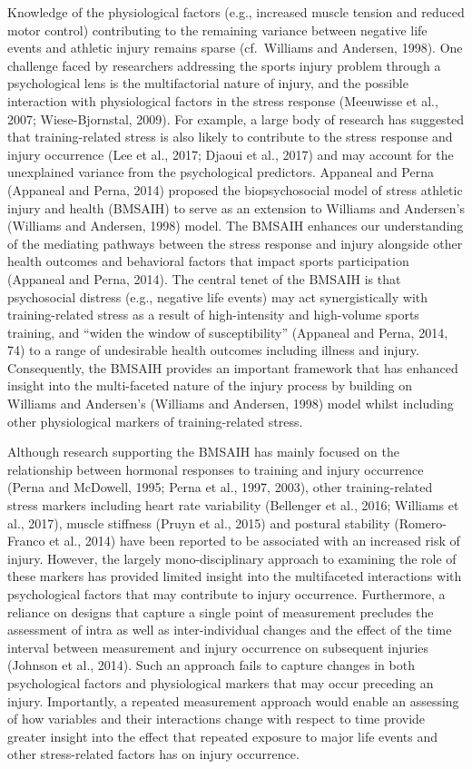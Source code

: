 \documentclass[
  english,
  man,floatsintext]{apa6}
\begin{document}
Knowledge of the physiological factors (e.g., increased muscle tension and reduced motor control) contributing to the remaining variance between negative life events and athletic injury remains sparse (cf.~Williams and Andersen, 1998). One challenge faced by researchers addressing the sports injury problem through a psychological lens is the multifactorial nature of injury, and the possible interaction with physiological factors in the stress response (Meeuwisse et al., 2007; Wiese-Bjornstal, 2009). For example, a large body of research has suggested that training-related stress is also likely to contribute to the stress response and injury occurrence (Lee et al., 2017; Djaoui et al., 2017) and may account for the unexplained variance from the psychological predictors. Appaneal and Perna (Appaneal and Perna, 2014) proposed the biopsychosocial model of stress athletic injury and health (BMSAIH) to serve as an extension to Williams and Andersen's (Williams and Andersen, 1998) model. The BMSAIH enhances our understanding of the mediating pathways between the stress response and injury alongside other health outcomes and behavioral factors that impact sports participation (Appaneal and Perna, 2014). The central tenet of the BMSAIH is that psychosocial distress (e.g., negative life events) may act synergistically with training-related stress as a result of high-intensity and high-volume sports training, and ``widen the window of susceptibility'' (Appaneal and Perna, 2014, 74) to a range of undesirable health outcomes including illness and injury. Consequently, the BMSAIH provides an important framework that has enhanced insight into the multi-faceted nature of the injury process by building on Williams and Andersen's (Williams and Andersen, 1998) model whilst including other physiological markers of training-related stress.

Although research supporting the BMSAIH has mainly focused on the relationship between hormonal responses to training and injury occurrence (Perna and McDowell, 1995; Perna et al., 1997, 2003), other training-related stress markers including heart rate variability (Bellenger et al., 2016; Williams et al., 2017), muscle stiffness (Pruyn et al., 2015) and postural stability (Romero-Franco et al., 2014) have been reported to be associated with an increased risk of injury. However, the largely mono-disciplinary approach to examining the role of these markers has provided limited insight into the multifaceted interactions with psychological factors that may contribute to injury occurrence. Furthermore, a reliance on designs that capture a single point of measurement precludes the assessment of intra as well as inter-individual changes and the effect of the time interval between measurement and injury occurrence on subsequent injuries (Johnson et al., 2014). Such an approach fails to capture changes in both psychological factors and physiological markers that may occur preceding an injury. Importantly, a repeated measurement approach would enable an assessing of how variables and their interactions change with respect to time provide greater insight into the effect that repeated exposure to major life events and other stress-related factors has on injury occurrence.
\end{document}
